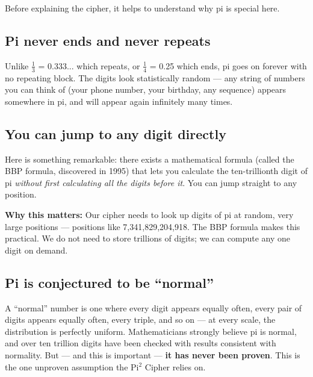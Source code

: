 \documentclass[12pt, a4paper]{article}
\begin{document}
\vspace{0.5em}

Before explaining the cipher, it helps to understand why pi is special here.

\subsection{Pi never ends and never repeats}

Unlike $\frac{1}{3}$ = 0.333... which repeats, or $\frac{1}{4}$ = 0.25 which ends, pi goes on forever with no repeating block. The digits look statistically random --- any string of numbers you can think of (your phone number, your birthday, any sequence) appears somewhere in pi, and will appear again infinitely many times.

\subsection{You can jump to any digit directly}

Here is something remarkable: there exists a mathematical formula (called the BBP formula, discovered in 1995) that lets you calculate the ten-trillionth digit of pi \textit{without first calculating all the digits before it}. You can jump straight to any position.

\begin{greenbox}
\textbf{Why this matters:} Our cipher needs to look up digits of pi at random, very large positions --- positions like 7,341,829,204,918. The BBP formula makes this practical. We do not need to store trillions of digits; we can compute any one digit on demand.
\end{greenbox}

\subsection{Pi is conjectured to be ``normal''}

A ``normal'' number is one where every digit appears equally often, every pair of digits appears equally often, every triple, and so on --- at every scale, the distribution is perfectly uniform. Mathematicians strongly believe pi is normal, and over ten trillion digits have been checked with results consistent with normality. But --- and this is important --- \textbf{it has never been proven}. This is the one unproven assumption the Pi$^2$ Cipher relies on.

\end{document}
